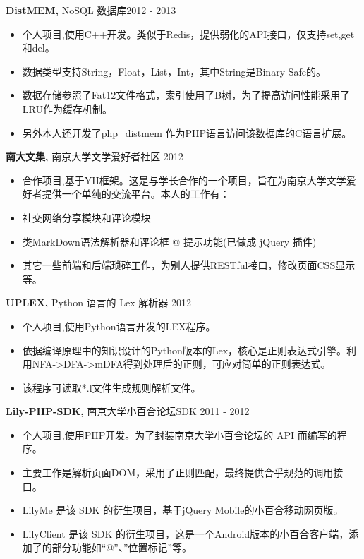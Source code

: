 \documentclass[margin]{res}
\begin{document}
\begin{resume}
 
 
{\bf DistMEM,} NoSQL 数据库\hfill  2012 - 2013
\begin{itemize} \itemsep -2pt
\item 个人项目,使用C++开发。类似于Redis，提供弱化的API接口，仅支持set,get和del。
\item 数据类型支持String，Float，List，Int，其中String是Binary Safe的。
\item 数据存储参照了Fat12文件格式，索引使用了B树，为了提高访问性能采用了LRU作为缓存机制。
\item 另外本人还开发了php\_distmem 作为PHP语言访问该数据库的C语言扩展。
\end{itemize}

{\bf 南大文集,} 南京大学文学爱好者社区 \hfill 2012
\begin{itemize} \itemsep -2pt
\item 合作项目,基于YII框架。这是与学长合作的一个项目，旨在为南京大学文学爱好者提供一个单纯的交流平台。本人的工作有：
\item 社交网络分享模块和评论模块
\item 类MarkDown语法解析器和评论框 @ 提示功能(已做成 jQuery 插件)
\item 其它一些前端和后端琐碎工作，为别人提供RESTful接口，修改页面CSS显示等。
\end{itemize}

{\bf UPLEX,} Python 语言的 Lex 解析器 \hfill 2012
\begin{itemize} \itemsep -2pt
\item 个人项目,使用Python语言开发的LEX程序。
\item 依据编译原理中的知识设计的Python版本的Lex，核心是正则表达式引擎。利用NFA->DFA->mDFA得到处理后的正则，可应对简单的正则表达式。
\item 该程序可读取*.l文件生成规则解析文件。
\end{itemize}

{\bf Lily-PHP-SDK,} 南京大学小百合论坛SDK \hfill 2011 - 2012
\begin{itemize} \itemsep -2pt
\item 个人项目,使用PHP开发。为了封装南京大学小百合论坛的 API 而编写的程序。
\item 主要工作是解析页面DOM，采用了正则匹配，最终提供合乎规范的调用接口。
\item LilyMe 是该 SDK 的衍生项目，基于jQuery Mobile的小百合移动网页版。
\item LilyClient 是该 SDK 的衍生项目，这是一个Android版本的小百合客户端，添加了的部分功能如“@”、”位置标记”等。
\end{itemize}


\end{resume}
\end{document}
